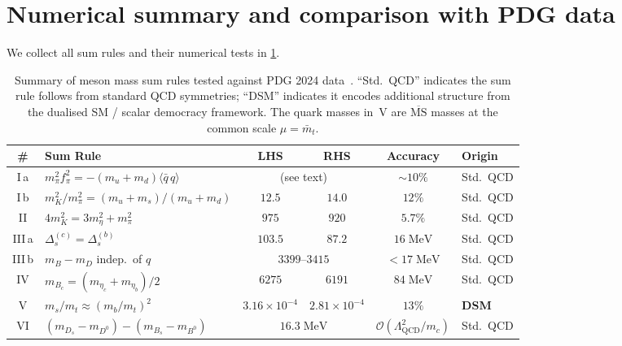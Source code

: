 \documentclass[11pt,a4paper]{article}
\newcommand{\qqbar}{\langle \bar{q}\,q \rangle}
\newcommand{\fpi}{f_\pi}
\newcommand{\QCD}{\ensuremath{\mathrm{QCD}}}
\newcommand{\LQCD}{\Lambda_{\QCD}}
\newcommand{\Ord}{\mathcal{O}}
\theoremstyle{plain}
\begin{document}
\section{Numerical summary and comparison with PDG data}
\label{sec:numerical}

We collect all sum rules and their numerical tests in
\cref{tab:summary}.

\begin{table}[h!]
\centering
\renewcommand{\arraystretch}{1.3}
\caption{Summary of meson mass sum rules tested against PDG 2024
  data~\cite{PDG2024}.  ``Std.\ QCD'' indicates the sum rule follows
  from standard QCD symmetries; ``DSM'' indicates it encodes additional
  structure from the dualised SM / scalar democracy framework.  The
  quark masses in~V are $\overline{\text{MS}}$ masses at the common
  scale $\mu = \bar{m}_t$.}
\label{tab:summary}
\small
\begin{tabular}{clcccl}
\toprule
\textbf{\#} & \textbf{Sum Rule} & \textbf{LHS} & \textbf{RHS}
  & \textbf{Accuracy} & \textbf{Origin} \\
\midrule
I\,a & $m_\pi^2 \fpi^2 = -(m_u+m_d)\qqbar$ & \multicolumn{2}{c}{(see text)}
  & $\sim 10\%$ & Std.\ QCD \\
I\,b & $m_K^2/m_\pi^2 = (m_u+m_s)/(m_u+m_d)$ & $12.5$ & $14.0$
  & $12\%$ & Std.\ QCD \\[3pt]
II & $4m_K^2 = 3m_\eta^2 + m_\pi^2$ & $975$ & $920$
  & $5.7\%$ & Std.\ QCD \\[3pt]
III\,a & $\Delta_s^{(c)} = \Delta_s^{(b)}$ & $103.5$ & $87.2$
  & $16\;\text{MeV}$ & Std.\ QCD \\
III\,b & $m_B - m_D$ indep.\ of $q$ & \multicolumn{2}{c}{$3399$--$3415$}
  & $< 17\;\text{MeV}$ & Std.\ QCD \\[3pt]
IV & $m_{B_c} = (m_{\eta_c} + m_{\eta_b})/2$ & $6275$ & $6191$
  & $84\;\text{MeV}$ & Std.\ QCD \\[3pt]
V & $m_s/m_t \approx (m_b/m_t)^2$ & $3.16 \times 10^{-4}$
  & $2.81 \times 10^{-4}$ & $13\%$ & \textbf{DSM} \\[3pt]
VI & $(m_{D_s}-m_{D^0})-(m_{B_s}-m_{B^0})$ & \multicolumn{2}{c}{$16.3\;\text{MeV}$}
  & $\Ord(\LQCD^2/m_c)$ & Std.\ QCD \\
\bottomrule
\end{tabular}
\end{table}
\end{document}

